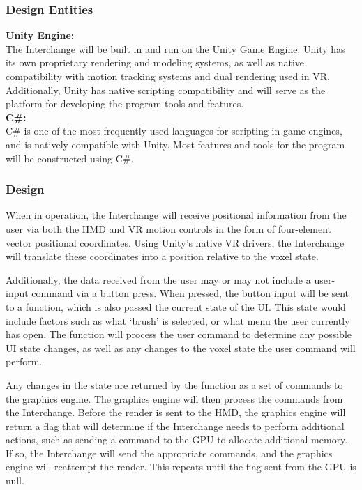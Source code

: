 \documentclass[onecolumn, draftclsnofoot,10pt, compsoc]{IEEEtran}
\begin{document}
\subsubsection{Design Entities}
\textbf{Unity Engine:}\\
The Interchange will be built in and run on the Unity Game Engine. Unity has its own proprietary rendering and modeling systems, as well as native compatibility with motion tracking systems and dual rendering used in VR. Additionally, Unity has native scripting compatibility and will serve as the platform for developing the program tools and features.\cite{unity}\\
\textbf{C\#:}\\
C\# is one of the most frequently used languages for scripting in game engines, and is natively compatible with Unity. Most features and tools for the program will be constructed using C\#. 

\subsubsection{Design}
When in operation, the Interchange will receive positional information from the user via both the HMD and VR motion controls in the form of four-element vector positional coordinates. Using Unity’s native VR drivers, the Interchange will translate these coordinates into a position relative to the voxel state.

Additionally, the data received from the user may or may not include a user-input command via a button press. When pressed, the button input will be sent to a function, which is also passed the current state of the UI. This state would include factors such as what ‘brush’ is selected, or what menu the user currently has open. The function will process the user command to determine any possible UI state changes, as well as any changes to the voxel state the user command will perform. 

Any changes in the state are returned by the function as a set of commands to the graphics engine. The graphics engine will then process the commands from the Interchange. Before the render is sent to the HMD, the graphics engine will return a flag that will determine if the Interchange needs to perform additional actions, such as sending a command to the GPU to allocate additional memory. If so, the Interchange will send the appropriate commands, and the graphics engine will reattempt the render. This repeats until the flag sent from the GPU is null. 
\end{document}
